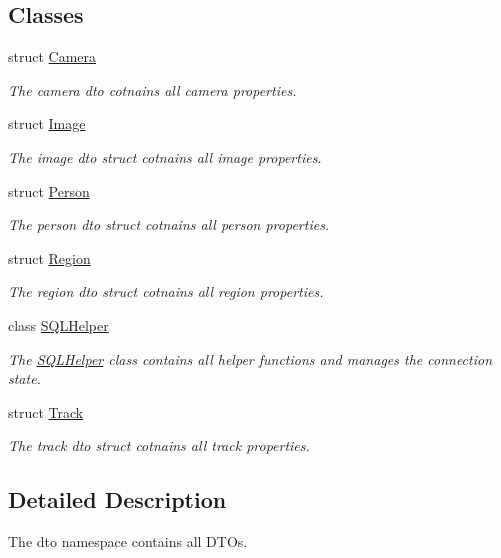 \subsection*{Classes}
\begin{DoxyCompactItemize}
\item 
struct \mbox{\hyperlink{structdto_1_1_camera}{Camera}}
\begin{DoxyCompactList}\small\item\em The camera dto cotnains all camera properties. \end{DoxyCompactList}\item 
struct \mbox{\hyperlink{structdto_1_1_image}{Image}}
\begin{DoxyCompactList}\small\item\em The image dto struct cotnains all image properties. \end{DoxyCompactList}\item 
struct \mbox{\hyperlink{structdto_1_1_person}{Person}}
\begin{DoxyCompactList}\small\item\em The person dto struct cotnains all person properties. \end{DoxyCompactList}\item 
struct \mbox{\hyperlink{structdto_1_1_region}{Region}}
\begin{DoxyCompactList}\small\item\em The region dto struct cotnains all region properties. \end{DoxyCompactList}\item 
class \mbox{\hyperlink{classdto_1_1_s_q_l_helper}{S\+Q\+L\+Helper}}
\begin{DoxyCompactList}\small\item\em The \mbox{\hyperlink{classdto_1_1_s_q_l_helper}{S\+Q\+L\+Helper}} class contains all helper functions and manages the connection state. \end{DoxyCompactList}\item 
struct \mbox{\hyperlink{structdto_1_1_track}{Track}}
\begin{DoxyCompactList}\small\item\em The track dto struct cotnains all track properties. \end{DoxyCompactList}\end{DoxyCompactItemize}


\subsection{Detailed Description}
The dto namespace contains all D\+T\+Os. 